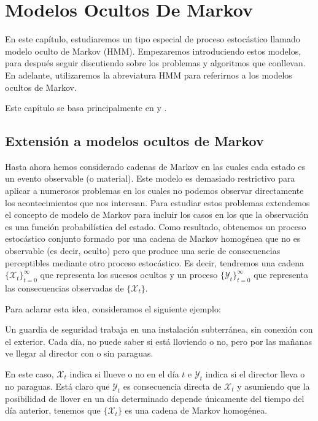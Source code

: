 \chapter{Modelos Ocultos De Markov}


En este capítulo, estudiaremos un tipo especial de proceso estocástico llamado modelo oculto de Markov (HMM). Empezaremos introduciendo estos modelos, para después seguir discutiendo sobre los problemas y algoritmos que conllevan. En adelante, utilizaremos la abreviatura HMM para referirnos a los modelos ocultos de Markov. 

Este capítulo se basa principalmente en \cite{Rabiner} y \cite{Russell}.

\section{Extensión a modelos ocultos de Markov}
Hasta ahora hemos considerado cadenas de Markov en las cuales cada estado es un evento observable (o material). Este modelo es demasiado restrictivo para aplicar a numerosos problemas en los cuales no podemos observar directamente los acontecimientos que nos interesan. Para estudiar estos problemas extendemos el concepto de modelo de Markov para incluir los casos en los que la observación es una función probabilística del estado. Como resultado, obtenemos un proceso estocástico conjunto formado por una cadena de Markov homogénea que no es observable (es decir, oculto) pero que produce una serie de consecuencias perceptibles mediante otro proceso estocástico. Es decir, tendremos una cadena $\{\mathcal{X}_t\}_{t=0}^{\infty}$ que representa los sucesos ocultos y un proceso $\{\mathcal{Y}_t\}_{t=0}^{\infty}$ que representa las consecuencias observadas de $\{\mathcal{X}_t\}$. 

Para aclarar esta idea, consideramos el siguiente ejemplo:

\begin{exampleth}\label{ejemplo_paraguas}
Un guardia de seguridad trabaja en una instalación subterránea, sin conexión con el exterior. Cada día, no puede saber si está lloviendo o no, pero por las mañanas ve llegar al director con o sin paraguas.

En este caso, $\mathcal{X}_t$ indica si llueve o no en el día $t$ e $\mathcal{Y}_t$ indica si el director lleva o no paraguas. Está claro que $\mathcal{Y}_t$ es consecuencia directa de $\mathcal{X}_t$ y asumiendo que la posibilidad de llover en un día determinado depende únicamente del tiempo del día anterior, tenemos que $\{\mathcal{X}_t\}$ es una cadena de Markov homogénea.

\end{exampleth}

